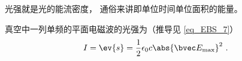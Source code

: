 
\begin{issues}
\issueDraft
\end{issues}

光强就是光的能流密度， 通俗来讲即单位时间单位面积的能量。

真空中一列单频的平面电磁波的光强为（推导见 \autoref{eq_EBS_7}）
\begin{equation}
I = \ev{s} = \frac{1}{2} \epsilon_0 c \abs{\bvec E_\text{max}}^2~.
\end{equation}
